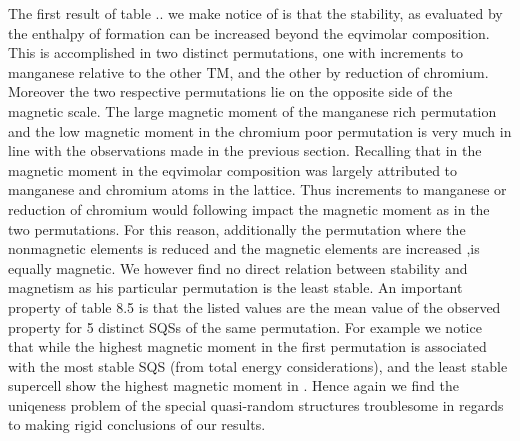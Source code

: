 The first result of table .. we make notice of is that the stability, as evaluated by the enthalpy of formation can be increased beyond the eqvimolar composition. This is accomplished in two distinct permutations, one with increments to  manganese relative to the other TM, and the other by reduction of chromium. Moreover the two respective permutations lie on the opposite side of the magnetic scale. The large magnetic moment of the manganese rich permutation and the low magnetic moment in the chromium poor permutation is very much in line with the observations made in the previous section. Recalling that in the magnetic moment in the eqvimolar composition was largely attributed to manganese and chromium atoms in the lattice. Thus increments to manganese or reduction of chromium would following impact the magnetic moment as in the two permutations. For this reason, additionally the permutation  where the nonmagnetic elements is reduced and the magnetic elements are increased ,is equally magnetic. We however find no direct relation between stability and magnetism as his particular permutation is the least stable. An important property of table 8.5 is that the listed values are the mean value of the observed property for 5 distinct SQSs of the same permutation. For example we notice that while the highest magnetic moment in the first permutation is associated with the most stable SQS (from total energy considerations), and the least stable supercell show the highest magnetic moment in . Hence again we find the uniqeness problem of the special quasi-random structures troublesome in regards to making rigid conclusions of our results.  

